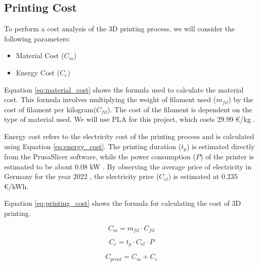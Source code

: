 \subsection{Printing Cost}
\label{subsec:printing_cost}

To perform a cost analysis of the 3D printing process, we will consider the following parameters:

\begin{itemize}
    \item Material Cost ($C_m$)
    \item Energy Cost ($C_e$)
\end{itemize}

Equation \ref{eq:material_cost} shows the formula used to calculate the material cost. This formula involves multiplying the weight of filament used ($m_{fil}$) by the cost of filament per kilogram($C_{fil}$). The cost of the filament is dependent on the type of material used. We will use PLA for this project, which costs 29.99 €/kg \cite{PrusaCost}.

Energy cost refers to the electricity cost of the printing process and is calculated using Equation \ref{eq:energy_cost}. The printing duration ($t_p$) is estimated directly from the PrusaSlicer software, while the power consumption ($P$) of the printer is estimated to be about 0.08 kW \cite{Prusa}. By observing the average price of electricity in Germany for the year 2022 \cite{NordPool}, the electricity price ($C_{el}$) is estimated at 0.235 €/kWh.

Equation \ref{eq:printing_cost} shows the formula for calculating the cost of 3D printing.

\begin{equation}
    \label{eq:material_cost}
    C_{m} = m_{fil}\cdot C_{fil}
\end{equation}

\begin{equation}
    \label{eq:energy_cost}
    C_{e} = t_{p}\cdot C_{el}\cdot P
\end{equation}

\begin{equation}
    \label{eq:printing_cost}
    C_{print} = C_{m} + C_{e}
\end{equation}



